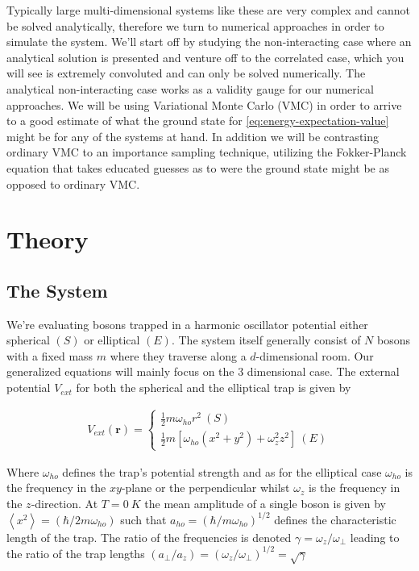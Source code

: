 Typically large multi-dimensional systems like these are very complex and cannot be solved analytically, therefore we turn to numerical approaches in order to simulate the system. We'll start off by studying the non-interacting case where an analytical solution is presented and venture off to the correlated case, which you will see is extremely convoluted and can only be solved numerically. The analytical non-interacting case works as a validity gauge for our numerical approaches. We will be using Variational Monte Carlo (VMC) in order to arrive to a good estimate of what the ground state for \autoref{eq:energy-expectation-value} might be for any of the systems at hand. In addition we will be contrasting ordinary VMC to an importance sampling technique, utilizing the Fokker-Planck equation that takes educated guesses as to were the ground state might be as opposed to ordinary VMC.

\section{Theory}

\subsection{The System}

We're evaluating bosons trapped in a harmonic oscillator potential either spherical $(S)$ or elliptical $(E)$. The system itself generally consist of $N$ bosons with a fixed mass $m$ where they traverse along a $d$-dimensional room. Our generalized equations will mainly focus on the 3 dimensional case. The external potential $V_{ext}$ for both the spherical and the elliptical trap is given by

\begin{align}
    V_{ext} (\mathbf{r}) =
  \begin{cases}
    \frac{1}{2}m \omega_{ho}r^2 \ (S)\\
    \frac{1}{2}m \left[ \omega_{ho} \left( x^2+y^2 \right) + \omega_z^2 z^2 \right] \ (E)
  \end{cases}
  \label{eq:ext-pottential}
\end{align}

Where $\omega_{ho}$ defines the trap's potential strength and as for the elliptical case $\omega_{ho}$ is the frequency in the $xy$-plane or the perpendicular whilst $\omega_z$ is the frequency in the $z$-direction. At $T= 0\ K$ the mean amplitude of a single boson is given by $\left\langle x^2 \right\rangle = \left( \hbar/2m\omega_{ho} \right)$ such that $a_{ho}= \left( \hbar/m\omega_{ho} \right)^{1/2}$ defines the characteristic length of the trap. The ratio of the frequencies is denoted $\gamma = \omega_z/\omega_\perp$ leading to the ratio of the trap lengths $\left( a_\perp/a_z \right) = \left( \omega_z/\omega_\perp \right)^{1/2} = \sqrt{\gamma}$


